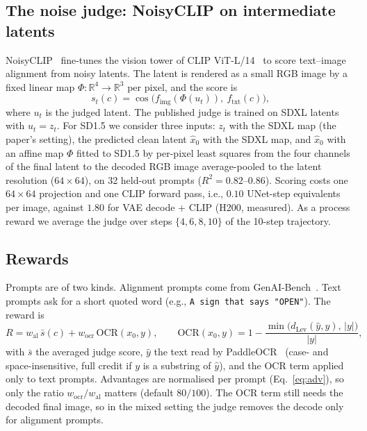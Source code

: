 \documentclass{article}
\newcommand{\xhat}{\hat{x}_0}
\begin{document}
\subsection{The noise judge: NoisyCLIP on intermediate latents}
NoisyCLIP~\citep{ramos2026noisyclip} fine-tunes the vision tower of CLIP ViT-L/14~\citep{radford2021clip} to score
text--image alignment from noisy latents. The latent is rendered as a small RGB image by a fixed linear map
$\Phi:\mathbb R^4\to\mathbb R^3$ per pixel, and the score is
\begin{equation}
  s_t(c) = \cos\big(f_{\mathrm{img}}(\Phi(u_t)),\ f_{\mathrm{txt}}(c)\big),
  \label{eq:nc}
\end{equation}
where $u_t$ is the judged latent. The published judge is trained on SDXL latents with $u_t=z_t$. For SD1.5 we consider three
inputs: $z_t$ with the SDXL map (the paper's setting), the predicted clean latent $\xhat$ with the SDXL map, and $\xhat$ with an
affine map $\Phi$ fitted to SD1.5 by per-pixel least squares from the four channels of the final latent to the decoded RGB
image average-pooled to the latent resolution ($64\times64$), on 32 held-out prompts ($R^2=0.82$--$0.86$). Scoring costs one $64\times64$
projection and one CLIP forward pass, i.e., $0.10$ UNet-step equivalents per image, against $1.80$ for VAE decode + CLIP
(H200, measured). As a process reward we average the judge over steps $\{4,6,8,10\}$ of the 10-step trajectory.

\subsection{Rewards}
Prompts are of two kinds. Alignment prompts come from GenAI-Bench~\citep{li2024genaibench}. Text prompts ask for a short
quoted word (e.g., \texttt{A sign that says "OPEN"}). The reward is
\begin{equation}
  R = w_{\mathrm{al}}\, \bar s(c) + w_{\mathrm{ocr}}\,\mathrm{OCR}(x_0, y),\qquad
  \mathrm{OCR}(x_0,y) = 1-\frac{\min\big(d_{\mathrm{Lev}}(\hat y, y),\,|y|\big)}{|y|},
  \label{eq:reward}
\end{equation}
with $\bar s$ the averaged judge score, $\hat y$ the text read by PaddleOCR~\citep{li2022ppocrv3} (case- and space-insensitive,
full credit if $y$ is a substring of $\hat y$), and the OCR term applied only to text prompts. Advantages are normalised per
prompt (Eq.~\ref{eq:adv}), so only the ratio $w_{\mathrm{ocr}}/w_{\mathrm{al}}$ matters (default $80/100$). The OCR term still
needs the decoded final image, so in the mixed setting the judge removes the decode only for alignment prompts.
\end{document}
